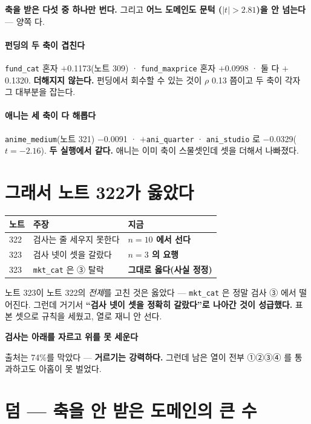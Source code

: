 \documentclass[10pt]{article}
\begin{document}
\textbf{축을 받은 다섯 중 하나만 번다.} 그리고 \textbf{어느 도메인도 문턱
($|t|{>}2.81$)을 안 넘는다} --- 양쪽 다.

\paragraph{펀딩의 두 축이 겹친다} \texttt{fund\_cat} 혼자 $+$0.1173(노트 309) ·
\texttt{fund\_maxprice} 혼자 $+$0.0998 · 둘 다 $+$0.1320. \textbf{더해지지
않는다.} 펀딩에서 회수할 수 있는 것이 $\rho$ 0.13 쯤이고 두 축이 각자
그 대부분을 잡는다.

\paragraph{애니는 세 축이 다 해롭다} \texttt{anime\_medium}(노트 321)
$-$0.0091 · $+$\texttt{ani\_quarter} · \texttt{ani\_studio} 로
$-$0.0329($t{=}{-}2.16$). \textbf{두 실행에서 같다.} 애니는 이미 축이
스물셋인데 셋을 더해서 나빠졌다.

\section{그래서 노트 322가 옳았다}

\begin{center}\footnotesize
\begin{tabular}{lll}
\hline
노트 & 주장 & 지금 \\
\hline
322 & 검사는 줄 세우지 못한다 & \textbf{$n{=}10$ 에서 선다} \\
323 & 검사 넷이 셋을 갈랐다 & \textbf{$n{=}3$ 의 요행} \\
323 & \texttt{mkt\_cat} 은 ③ 탈락 & \textbf{그대로 옳다(사실 정정)} \\
\hline
\end{tabular}
\end{center}

노트 323이 노트 322의 \emph{전제}를 고친 것은 옳았다 --- \texttt{mkt\_cat} 은
정말 검사 ③ 에서 떨어진다. 그런데 거기서 \textbf{``검사 넷이 셋을 정확히
갈랐다''로 나아간 것이 성급했다.} 표본 셋으로 규칙을 세웠고, 열로 재니
안 선다.

\begin{center}\small
\textbf{검사는 아래를 자르고 위를 못 세운다}
\end{center}

출처는 74\%를 막았다 --- \textbf{거르기는 강력하다.} 그런데 남은 열이
전부 ①②③④ 를 통과하고도 아홉이 못 벌었다.

\section{덤 --- 축을 안 받은 도메인의 큰 수}
\end{document}
